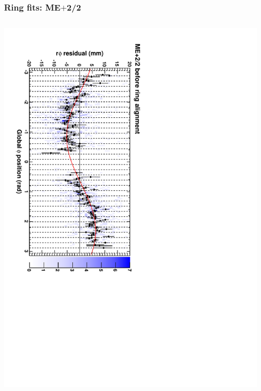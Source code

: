 \documentclass[compress]{beamer}
\begin{document}
\begin{frame}
\frametitle{Ring fits: ME$+$2/2}
\vfill
\begin{columns}
\includegraphics[height=\linewidth, angle=90]{ringfits_before/mep22.pdf}


\end{columns}
\end{frame}
\end{document}
